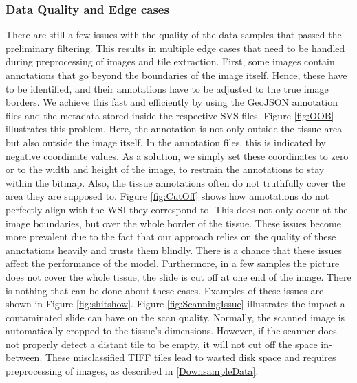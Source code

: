 \subsubsection{Data Quality and Edge cases}
There are still a few issues with the quality of the data samples that passed the preliminary filtering. This results in multiple edge cases that need to be handled during preprocessing of images and tile extraction. First, some images contain annotations that go beyond the boundaries of the image itself. Hence, these have to be identified, and their annotations have to be adjusted to the true image borders. We achieve this fast and efficiently by using the GeoJSON annotation files and the metadata stored inside the respective SVS files. Figure \ref{fig:OOB} illustrates this problem. Here, the annotation is not only outside the tissue area but also outside the image itself. In the annotation files, this is indicated by negative coordinate values.  As a solution, we simply set these coordinates to zero or to the width and height of the image, to restrain the annotations to stay within the bitmap.
Also, the tissue annotations often do not truthfully cover the area they are supposed to. 
Figure \ref{fig:CutOff} shows how annotations do not perfectly align with the WSI they correspond to. This does not only occur at the image boundaries, but over the whole border of the tissue. These issues become more prevalent due to the fact that our approach relies on the quality of these annotations heavily and trusts them blindly. There is a chance that these issues affect the performance of the model.
Furthermore, in a few samples the picture does not cover the whole tissue, the slide is cut off at one end of the image. There is nothing that can be done about these cases. Examples of these issues are shown in Figure \ref{fig:shitshow}.
Figure \ref{fig:ScanningIssue} illustrates the impact a contaminated slide can have on the scan quality. Normally, the scanned image is automatically cropped to the tissue's dimensions. However, if the scanner does not properly detect a distant tile to be empty, it will not cut off the space in-between. These misclassified TIFF tiles lead to wasted disk space and requires preprocessing of images, as described in \ref{DownsampleData}.


